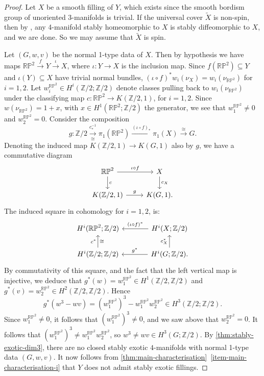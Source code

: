 \documentclass[a4paper, reqno]{amsart}
\theoremstyle{definition}
\theoremstyle{remark}
\newcommand{\Z}{\mathbb{Z}}
\newcommand{\wt}{\widetilde}
\newcommand{\RP}{\mathbb{RP}}
\begin{document}
\begin{proof}
	Let $X$ be a smooth filling of $Y$, which exists since the smooth bordism group of unoriented 3-manifolds is trivial. If the universal cover $\wt{X}$ is non-spin, then by , any 4-manifold stably homeomorphic to $X$ is stably diffeomorphic to $X$, and we are done. So we may assume that  $\wt{X}$ is spin. 
    
    Let $(G,w,v)$ be the normal 1-type data of $X$.
    Then by hypothesis we have maps $\RP^2\xrightarrow{f}Y\xrightarrow{\iota} X$, where $\iota\colon Y \to X$ is the inclusion map. 
 Since $f(\RP^2) \subseteq Y$ and $\iota(Y) \subseteq X$ have trivial normal bundles, $(\iota \circ f)^*w_i(\nu_{X}) = w_i(\nu_{\RP^2})$ for $i=1,2$. 
  Let $w_i^{\RP^2} \in H^i(\Z/2;\Z/2)$ denote classes pulling back to $w_i(\nu_{\RP^2})$ under the classifying map $c \colon \RP^2 \to K(\Z/2,1)$, for $i=1,2$.  Since $w(\nu_{\RP^2})=1+x$, with $x\in H^1(\RP^2;\Z/2)$ the generator,  we see that $w_1^{\RP^2} \neq 0$ and  $w_2^{\RP^2}=0$. 
  Consider the composition 
  \[g\colon \Z/2\xrightarrow[\cong]{c_*^{-1}}\pi_1(\RP^2)\xrightarrow{(\iota \circ f)_*}\pi_1(X)\xrightarrow{\cong}G.\]
Denoting the induced map $K(\Z/2,1) \to K(G,1)$ also by $g$, we have a commutative diagram
\[\begin{tikzcd}
    \RP^2 \ar[r,"\iota \circ f"] \ar[d,"c"] & X \ar[d,"c_X"] \\ K(\Z/2,1) \ar[r,"g"] & K(G,1). 
\end{tikzcd}\]
The induced square in cohomology for $i=1,2$, is: 
\[\begin{tikzcd}[column sep = large]
    H^i(\RP^2;\Z/2) &   H^i(X ;\Z/2) \ar[l,"(\iota \circ f)^*"'] \\ H^i(\Z/2 ;\Z/2) \ar[u,"c^*","\cong"']  & H^i(G ;\Z/2). \ar[l,"g^*"'] \ar[u,"c_X^*"]
\end{tikzcd}\]
 By commutativity of this square, and the fact that the left vertical map is injective, we deduce that  $g^*(w) = w_1^{\RP^2} \in H^1(\Z/2,\Z/2)$ and $g^*(v) = w_2^{\RP^2} \in H^2(\Z/2,\Z/2)$. Hence 
  \[g^*(w^3 - wv) = (w_1^{\RP^2})^3 - w_1^{\RP^2}w_2^{\RP^2} \in H^3(\Z/2;\Z/2).\] 
Since $w_1^{\RP^2} \neq 0$, it follows that $(w_1^{\RP^2})^3 \neq 0$, and we saw above that $w_2^{\RP^2}=0$.  
     It follows that $(w_1^{\RP^2})^3 \neq w_1^{\RP^2}w_2^{\RP^2}$, so $w^3 \neq wv \in H^3(G;\Z/2)$. 
    By \cref{thm:stably-exotic-dim3}, there are no closed stably exotic $4$-manifolds with normal 1-type data $(G,w,v)$. It now follows from \cref{thm:main-characterisation}~\eqref{item-main-characterisation-i} that $Y$ does not admit stably exotic fillings.
\end{proof}
\end{document}
